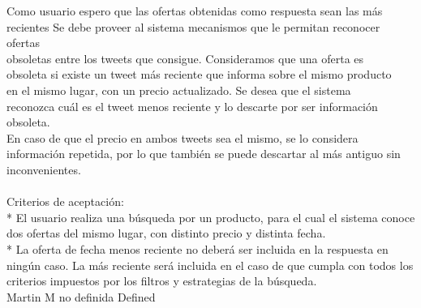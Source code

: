 \vspace{20pt}

	{Como usuario espero que las ofertas obtenidas como respuesta sean las más recientes} %
	{Se debe proveer al sistema mecanismos que le permitan reconocer ofertas\\
obsoletas entre los tweets que consigue. Consideramos que una oferta es\\
obsoleta si existe un tweet más reciente que informa sobre el mismo producto\\
en el mismo lugar, con un precio actualizado. Se desea que el sistema\\
reconozca cuál es el tweet menos reciente y lo descarte por ser información\\
obsoleta.\\
En caso de que el precio en ambos tweets sea el mismo, se lo considera\\
información repetida, por lo que también se puede descartar al más antiguo sin\\
inconvenientes.\\
  \\
Criterios de aceptación:\\
* El usuario realiza una búsqueda por un producto, para el cual el sistema conoce dos ofertas del mismo lugar, con distinto precio y distinta fecha.  \\
* La oferta de fecha menos reciente no deberá ser incluida en la respuesta en ningún caso. La más reciente será incluida en el caso de que cumpla con todos los criterios impuestos por los filtros y estrategias de la búsqueda.\\
} %
	{} %
	{} %
	{Martin M} %
	{no definida} %
	{Defined} %


\vspace{20pt}


